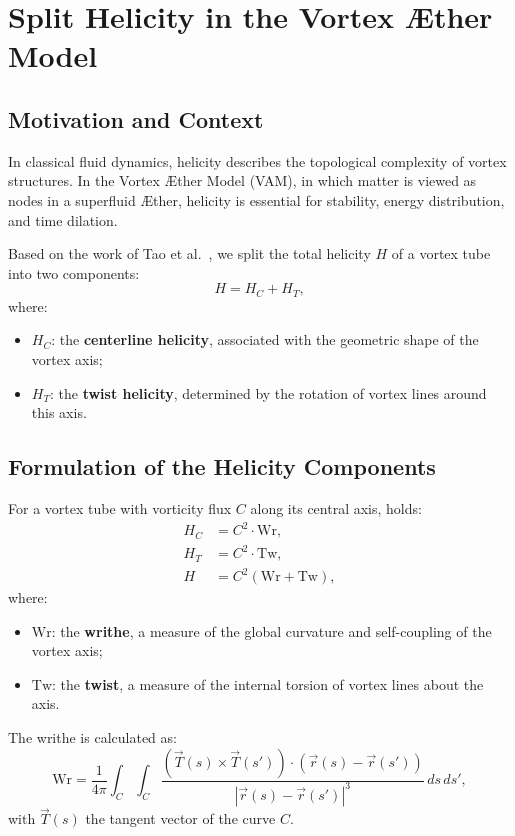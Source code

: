 \section{Split Helicity in the Vortex Æther Model}\label{appendix:10}

\subsection{Motivation and Context}

In classical fluid dynamics, helicity describes the topological complexity of vortex structures. In the Vortex Æther Model (VAM), in which matter is viewed as nodes in a superfluid Æther, helicity is essential for stability, energy distribution, and time dilation.

Based on the work of Tao et al.~\cite{Tao2021}, we split the total helicity $H$ of a vortex tube into two components:
\begin{equation}
    H = H_C + H_T,
\end{equation}
where:
\begin{itemize}
    \item $H_C$: the \textbf{centerline helicity}, associated with the geometric shape of the vortex axis;
    \item $H_T$: the \textbf{twist helicity}, determined by the rotation of vortex lines around this axis.
\end{itemize}

\subsection{Formulation of the Helicity Components}

For a vortex tube with vorticity flux $C$ along its central axis, holds:
\begin{align}
    H_C &= C^2 \cdot \text{Wr}, \\
    H_T &= C^2 \cdot \text{Tw}, \\
    H &= C^2 (\text{Wr} + \text{Tw}),
\end{align}
where:
\begin{itemize}
    \item $\text{Wr}$: the \textbf{writhe}, a measure of the global curvature and self-coupling of the vortex axis;
    \item $\text{Tw}$: the \textbf{twist}, a measure of the internal torsion of vortex lines about the axis.
\end{itemize}

The writhe is calculated as:
\begin{equation}
    \text{Wr} = \frac{1}{4\pi} \int_C \int_C \frac{\left(\vec{T}(s) \times \vec{T}(s')\right) \cdot \left(\vec{r}(s) - \vec{r}(s')\right)}{|\vec{r}(s) - \vec{r}(s')|^3} \, ds \, ds',
\end{equation}
with $\vec{T}(s)$ the tangent vector of the curve $C$.

